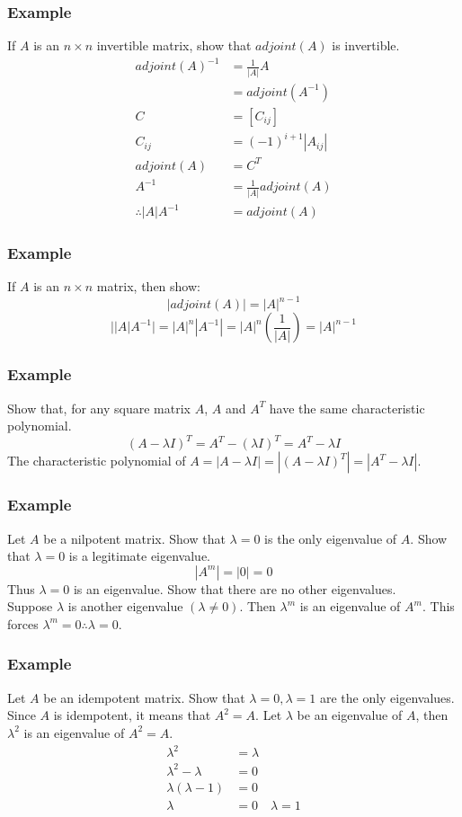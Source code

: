 \documentclass{math}
\begin{document}
\subsubsection*{Example}
If \( A \) is an \( n\times n \) invertible matrix, show that \( adjoint(A) \)
is invertible.
\begin{align*}
  adjoint(A)^{-1} &= \frac{1}{|A|}A \\
  &= adjoint(A^{-1}) \\
  C &= [C_{ij}] \\
  C_{ij} &= (-1)^{i+1}|A_{ij}| \\
  adjoint(A) &= C^T \\
  A^{-1} &= \frac{1}{|A|}adjoint(A) \\
  \therefore |A|A^{-1} &= adjoint(A)
\end{align*}

\subsubsection*{Example}
If \( A \) is an \( n\times n \) matrix, then show:
\[ |adjoint(A)| = |A|^{n-1} \]
\[ \bigg||A|A^{-1}\bigg| = |A|^n|A^{-1}| = |A|^n(\frac{1}{|A|}) = |A|^{n-1} \]

\subsubsection*{Example}
Show that, for any square matrix \( A \), \( A \) and \( A^T \) have the same
characteristic polynomial.
\[ (A-\lambda I)^T = A^T-(\lambda I)^T = A^T-\lambda I \]
The characteristic polynomial of \( A = |A-\lambda I| = |(A-\lambda I)^T| =
|A^T-\lambda I| \).

\subsubsection*{Example}
Let \( A \) be a nilpotent matrix. Show that \( \lambda = 0 \) is the only
eigenvalue of \( A \). Show that \( \lambda = 0 \) is a legitimate eigenvalue.
\[ |A^m| = |0| = 0 \]
Thus \( \lambda = 0 \) is an eigenvalue. Show that there are no other
eigenvalues. \\
Suppose \( \lambda \) is another eigenvalue \( (\lambda\ne0) \).
Then \( \lambda^m \) is an eigenvalue of \( A^m \). This forces \( \lambda^m =
0 \therefore \lambda = 0 \).

\subsubsection*{Example}
Let \( A \) be an idempotent matrix. Show that \( \lambda = 0,\lambda = 1 \) are
the only eigenvalues. \\
Since \( A \) is idempotent, it means that \( A^2 = A \). Let \( \lambda \) be
an eigenvalue of \( A \), then \( \lambda^2 \) is an eigenvalue of
\( A^2 = A \).
\begin{align*}
  \lambda^2 &= \lambda \\
  \lambda^2-\lambda &= 0 \\
  \lambda(\lambda-1) &= 0 \\
  \lambda &= 0 \quad \lambda = 1
\end{align*}
\end{document}
